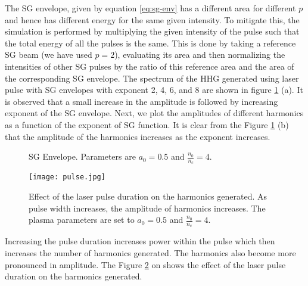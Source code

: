 
The SG envelope, given by equation \ref{eq:sg-env} has a different area for different $p$ and hence has different energy for the same given intensity. To mitigate this, the simulation is performed by multiplying the given intensity of the pulse such that the total energy of all the pulses is the same. This is done by taking a reference SG beam (we have used $p=2$), evaluating its area and then normalizing the intensities of other SG pulses by the ratio of this reference area and the area of the corresponding SG envelope. The spectrum of the HHG generated using laser pulse with SG envelopes with exponent 2, 4, 6, and 8 are shown in figure \ref{fig:sg} (a). It is observed that a small increase in the amplitude is followed by increasing exponent of the SG envelope. Next, we plot the amplitudes of different harmonics as a function of the exponent of SG function. It is clear from the Figure \ref{fig:sg} (b) that the amplitude of the harmonics increases as the exponent increases.

\begin{figure}[H]
    \centering
    \quad
    \caption{SG Envelope. Parameters are $a_0 = 0.5$ and $\frac{n_0}{n_c} = 4$.}
    \label{fig:sg}%
\end{figure}

\begin{figure}[H]
    \centering
    \texttt{[image: pulse.jpg]}
    \caption{Effect of the laser pulse duration on the harmonics generated. As pulse width increases, the amplitude of harmonics increases. The plasma parameters are set to $a_0 = 0.5$ and $\frac{n_0}{n_c} = 4$.}
    \label{fig:pulse}
\end{figure}


Increasing the pulse duration increases power within the pulse which then increases the number of harmonics generated. The harmonics also become more pronounced in amplitude.\cite{pulse-duration} The Figure \ref{fig:pulse} on shows the effect of the laser pulse duration on the harmonics generated.

